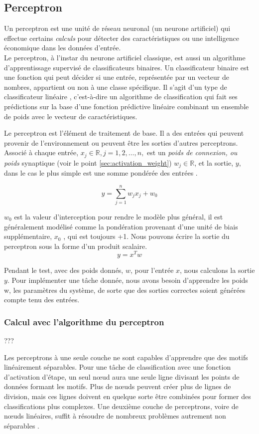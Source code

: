 	\subsection{Perceptron} \label{sec:perceptron}
	Un perceptron est une unité de réseau neuronal (un neurone artificiel) qui effectue certains \textit{calculs} pour détecter des caractéristiques ou une intelligence économique dans les données d'entrée.\\ 
	Le perceptron, à l'instar du neurone artificiel classique, est aussi un algorithme d'apprentissage supervisé de classificateurs binaires. Un classificateur binaire est une fonction qui peut décider si une entrée, représentée par un vecteur de nombres, appartient ou non à une classe spécifique. Il s'agit d'un type de classificateur linéaire , c'est-à-dire un algorithme de classification qui fait ses prédictions sur la base d'une fonction prédictive linéaire combinant un ensemble de poids avec le vecteur de caractéristiques.
	
	Le perceptron est l'élément de traitement de base. Il a des entrées qui peuvent provenir de l'environnement ou peuvent être les sorties d'autres perceptrons.
	Associé à chaque entrée, $ x_j \in \mathbb{R}, j = 1,2, \dots , n, $ est un \textit{poids de connexion, ou poids} synaptique (voir le point \ref{sec:activation_weight}) $w_j \in \mathbb{R} $, et la sortie, $y$, dans le cas le plus simple est une somme pondérée des entrées \cite{alpaydin2010introduction}.
	
	$$ {y = \sum _{j=1}^{n}w_{j}x_{j} + w_0} $$
	
	$w_0$ est la valeur d'interception pour rendre le modèle plus général, il est généralement modélisé comme la pondération provenant d'une unité de biais supplémentaire, $x_0$ , qui est toujours +1. Nous pouvons écrire la sortie du perceptron sous la forme d'un produit scalaire.
	$$ y = x^Tw $$
	
	Pendant le test, avec des poids donnés, $w$, pour l'entrée $x$, nous calculons la sortie $y$. Pour implémenter une tâche donnée, nous avons besoin d'apprendre les poids w, les paramètres du système, de sorte que des sorties correctes soient générées compte tenu des entrées.
	
	\subsubsection{Calcul avec l'algorithme du perceptron}
	???
	
	Les perceptrons à une seule couche ne sont capables d'apprendre que des motifs linéairement séparables. Pour une tâche de classification avec une fonction d'activation d'étape, un seul nœud aura une seule ligne divisant les points de données formant les motifs. Plus de nœuds peuvent créer plus de lignes de division, mais ces lignes doivent en quelque sorte être combinées pour former des classifications plus complexes. Une deuxième couche de perceptrons, voire de nœuds linéaires, suffit à résoudre de nombreux problèmes autrement non séparables \cite{antoine2018apprentissage}.

